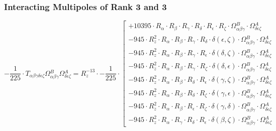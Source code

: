 \documentclass{article}
\begin{document}
\subsubsection{Interacting Multipoles of Rank 3 and 3}
\begin{equation}
- \frac{1}{225} \cdot T_{\alpha{}\beta{}\gamma{}\delta{}\epsilon{}\zeta{}} \Omega{}^{B}_{\alpha{}\beta{}\gamma{}} \Omega{}^{A}_{\delta{}\epsilon{}\zeta{}} = R_{z}^{-13} \cdot - \frac{1}{225} \cdot  \left[ \begin{array}{c} 
 		+ 10395 \cdot R_{\alpha{}} \cdot R_{\beta{}} \cdot R_{\gamma{}} \cdot R_{\delta{}} \cdot R_{\epsilon{}} \cdot R_{\zeta{}} \cdot \Omega{}^{B}_{\alpha{}\beta{}\gamma{}} \cdot \Omega{}^{A}_{\delta{}\epsilon{}\zeta{}} 
 \\[0.2em] 		 - 945 \cdot R_{z}^{2} \cdot R_{\alpha{}} \cdot R_{\beta{}} \cdot R_{\gamma{}} \cdot R_{\delta{}} \cdot \delta{}\left(\epsilon{}, \zeta{}\right) \cdot \Omega{}^{B}_{\alpha{}\beta{}\gamma{}} \cdot \Omega{}^{A}_{\delta{}\epsilon{}\zeta{}} 
 \\[0.2em] 		 - 945 \cdot R_{z}^{2} \cdot R_{\alpha{}} \cdot R_{\beta{}} \cdot R_{\gamma{}} \cdot R_{\epsilon{}} \cdot \delta{}\left(\delta{}, \zeta{}\right) \cdot \Omega{}^{B}_{\alpha{}\beta{}\gamma{}} \cdot \Omega{}^{A}_{\delta{}\epsilon{}\zeta{}} 
 \\[0.2em] 		 - 945 \cdot R_{z}^{2} \cdot R_{\alpha{}} \cdot R_{\beta{}} \cdot R_{\gamma{}} \cdot R_{\zeta{}} \cdot \delta{}\left(\delta{}, \epsilon{}\right) \cdot \Omega{}^{B}_{\alpha{}\beta{}\gamma{}} \cdot \Omega{}^{A}_{\delta{}\epsilon{}\zeta{}} 
 \\[0.2em] 		 - 945 \cdot R_{z}^{2} \cdot R_{\alpha{}} \cdot R_{\beta{}} \cdot R_{\delta{}} \cdot R_{\epsilon{}} \cdot \delta{}\left(\gamma{}, \zeta{}\right) \cdot \Omega{}^{B}_{\alpha{}\beta{}\gamma{}} \cdot \Omega{}^{A}_{\delta{}\epsilon{}\zeta{}} 
 \\[0.2em] 		 - 945 \cdot R_{z}^{2} \cdot R_{\alpha{}} \cdot R_{\beta{}} \cdot R_{\delta{}} \cdot R_{\zeta{}} \cdot \delta{}\left(\gamma{}, \epsilon{}\right) \cdot \Omega{}^{B}_{\alpha{}\beta{}\gamma{}} \cdot \Omega{}^{A}_{\delta{}\epsilon{}\zeta{}} 
 \\[0.2em] 		 - 945 \cdot R_{z}^{2} \cdot R_{\alpha{}} \cdot R_{\beta{}} \cdot R_{\epsilon{}} \cdot R_{\zeta{}} \cdot \delta{}\left(\gamma{}, \delta{}\right) \cdot \Omega{}^{B}_{\alpha{}\beta{}\gamma{}} \cdot \Omega{}^{A}_{\delta{}\epsilon{}\zeta{}} 
 \\[0.2em] 		 - 945 \cdot R_{z}^{2} \cdot R_{\alpha{}} \cdot R_{\gamma{}} \cdot R_{\delta{}} \cdot R_{\epsilon{}} \cdot \delta{}\left(\beta{}, \zeta{}\right) \cdot \Omega{}^{B}_{\alpha{}\beta{}\gamma{}} \cdot \Omega{}^{A}_{\delta{}\epsilon{}\zeta{}} 

\end{array}
\end{equation}
\end{document}
